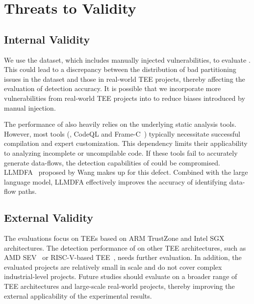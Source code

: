 \section{Threats to Validity} \label{s:val}

\subsection{Internal Validity}
We use the \ccBenchName dataset, which includes manually injected vulnerabilities, to evaluate \ccSysName.
This could lead to a discrepancy between the distribution of bad partitioning issues in the dataset and those in real-world TEE projects, thereby affecting the evaluation of detection accuracy.
It is possible that we incorporate more vulnerabilities from real-world TEE projects into \ccBenchName to reduce biases introduced by manual injection.

The performance of \ccSysName also heavily relies on the underlying static analysis tools.
However, most tools (\eg, CodeQL and Frame-C~\cite{framec}) typically necessitate successful compilation and expert customization.
This dependency limits their applicability to analyzing incomplete or uncompilable code.
If these tools fail to accurately generate data-flows, the detection capabilities of \ccSysName could be compromised.
LLMDFA~\cite{wang2024llmdfa} proposed by Wang \etal makes up for this defect.
Combined with the large language model, LLMDFA effectively improves the accuracy of identifying data-flow paths.

\subsection{External Validity}
The evaluations focus on TEEs based on ARM TrustZone and Intel SGX architectures. The detection performance of \ccSysName on other TEE architectures, such as AMD SEV~\cite{10.1145/3623392, 10.1145/3214292.3214301} or RISC-V-based TEE~\cite{10.1145/3433210.3453112, 9343170}, needs further evaluation.
In addition, the evaluated projects are relatively small in scale and do not cover complex industrial-level projects.
Future studies should evaluate \ccSysName on a broader range of TEE architectures and large-scale real-world projects, thereby improving the external applicability of the experimental results.

